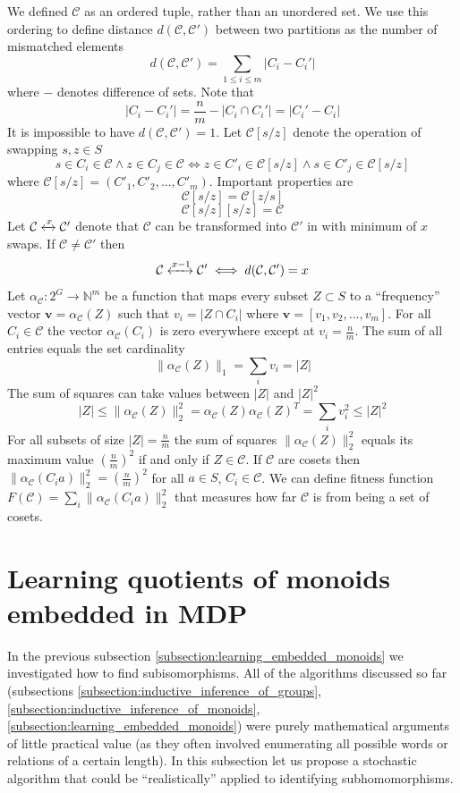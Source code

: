\documentclass[oneside,english,logo]{amuthesis}
\begin{document}
We defined $\mathcal{C}$ as an ordered tuple, rather than an unordered set. 
We use this ordering to define distance $d(\mathcal{C},\mathcal{C}')$ between two partitions as the number of mismatched elements \[
d(\mathcal{C},\mathcal{C}') = \sum_{1 \le i \le m} |C_i - C_i'|
\]
where $-$ denotes difference of sets. Note that 
\[|C_i - C_i'| = \frac{n}{m} - |C_i \cap C_i'| =  |C_i' - C_i|\]
It is impossible to have $d(\mathcal{C},\mathcal{C}')=1$. Let 
$\mathcal{C}[s/z]$ denote the operation of swapping $s,z\in S$  \[
s\in C_i \in \mathcal{C} \wedge z\in C_j \in \mathcal{C} \iff z\in C'_i \in  \mathcal{C}[s/z] \wedge s\in C'_j \in \mathcal{C}[s/z]
\]
where $\mathcal{C}[s/z]=(C'_1,C'_2,...,C'_m)$. Important properties are
\[
\mathcal{C}[s/z]=\mathcal{C}[z/s]
\]
\[
\mathcal{C}[s/z][s/z]=\mathcal{C}
\]
Let $\mathcal{C} \xleftrightarrow{x} \mathcal{C}'$ denote that $\mathcal{C}$ can be transformed into $\mathcal{C}'$ in with minimum of $x$ swaps. If $\mathcal{C}\ne \mathcal{C}'$ then
\[
\mathcal{C} \xleftrightarrow{x-1} \mathcal{C}' \iff d(\mathcal{C},\mathcal{C}')=x
\]
Let $\alpha_\mathcal{C}: 2^{G} \rightarrow \mathbb{N}^m$ be a function that maps every subset $Z \subset S$ to a ``frequency'' vector $\boldsymbol{v}=\alpha_\mathcal{C}(Z)$ such that $v_i=|Z \cap C_i|$ where $\boldsymbol{v}=[v_1,v_2,...,v_m]$.  For all $C_i \in \mathcal{C}$ the vector $\alpha_{\mathcal{C}}(C_i)$  is zero everywhere except at $v_i=\frac{n}{m}$. The sum of all entries equals the set cardinality \[
\lVert \alpha_\mathcal{C}(Z) \rVert_1=\sum_{i}v_i = |Z|
\]
The sum of squares can take values between $|Z|$ and $|Z|^2$ \[
|Z| \le \lVert \alpha_\mathcal{C}(Z) \rVert_2^2= \alpha_\mathcal{C}(Z) \alpha_\mathcal{C}(Z)^T =\sum_{i}v_i^2 \le |Z|^2
\]
For all subsets of size $|Z|=\frac{n}{m}$ the sum of squares $ \lVert \alpha_\mathcal{C}(Z) \rVert_2^2$ equals its maximum value $(\frac{n}{m})^2$ if and only if $Z\in \mathcal{C}$. 
If $\mathcal{C}$ are cosets then $\lVert \alpha_\mathcal{C}(C_ia) \rVert_2^2=(\frac{n}{m})^2$ for all $a \in S$, $C_i\in \mathcal{C}$. We can define fitness function $F(\mathcal{C})=\sum_i \lVert \alpha_\mathcal{C}(C_ia) \rVert_2^2$ that measures how far $\mathcal{C}$ is from being a set of cosets. 
\fi 

\iffalse
\section{Learning quotients of monoids embedded in MDP}

In the previous subsection \ref{subsection:learning_embedded_monoids} we investigated how to find subisomorphisms. All of the algorithms discussed so far (subsections \ref{subsection:inductive_inference_of_groups}, \ref{subsection:inductive_inference_of_monoids}, \ref{subsection:learning_embedded_monoids}) were purely mathematical arguments of little practical value (as they often involved enumerating all possible words or relations of a certain length). In this subsection let us propose a stochastic algorithm that could be ``realistically'' applied to identifying subhomomorphisms.
\end{document}
